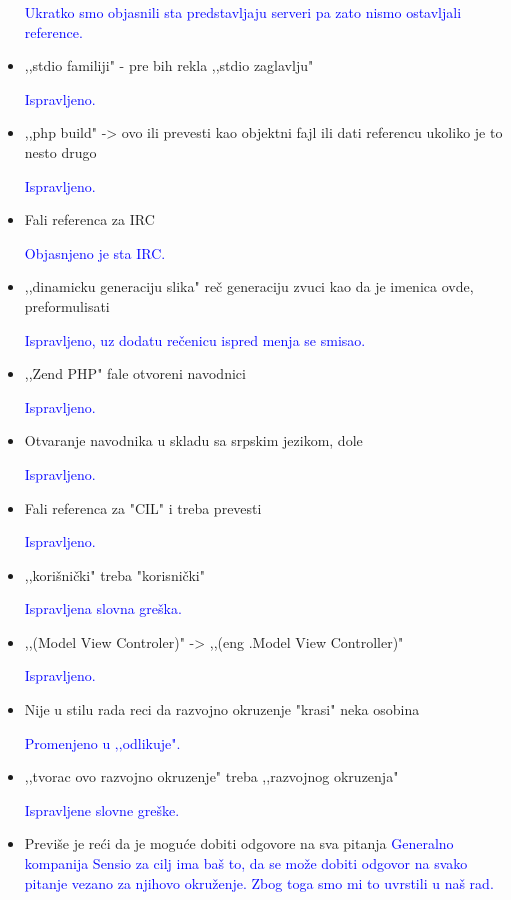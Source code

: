 \documentclass[a4paper]{report}
\newcommand{\odgovor}[1]{\textcolor{blue}{#1}}
\begin{document}
\begin{itemize}
\odgovor{Ukratko smo objasnili sta predstavljaju serveri pa zato nismo ostavljali reference.}

\item ,,stdio familiji" - pre bih rekla ,,stdio zaglavlju"

\odgovor{Ispravljeno.}

\item ,,php build" -> ovo ili prevesti kao objektni fajl ili dati referencu ukoliko je to nesto drugo

\odgovor{Ispravljeno.}

\item Fali referenca za IRC

\odgovor{Objasnjeno je sta IRC.}

\item ,,dinamicku generaciju slika" reč generaciju zvuci kao da je imenica ovde, preformulisati

\odgovor{Ispravljeno, uz dodatu rečenicu ispred menja se smisao.}

\item ,,Zend PHP" fale otvoreni navodnici

\odgovor{Ispravljeno.}

\item Otvaranje navodnika u skladu sa srpskim jezikom, dole

\odgovor{Ispravljeno.}

\item Fali referenca za "CIL" i treba prevesti

\odgovor{Ispravljeno.}

\item ,,korišnički" treba "korisnički"

\odgovor{Ispravljena slovna greška.}

\item ,,(Model View Controler)" -> ,,(eng .Model View Controller)"

\odgovor{Ispravljeno.}

\item Nije u stilu rada reci da razvojno okruzenje "krasi" neka osobina

\odgovor{Promenjeno u ‚‚odlikuje".}

\item ,,tvorac ovo razvojno okruzenje" treba ,,razvojnog okruzenja"

\odgovor{Ispravljene slovne greške.}

\item Previše je reći da je moguće dobiti odgovore na sva pitanja
\odgovor{Generalno kompanija Sensio za cilj ima baš to, da se može dobiti odgovor na svako pitanje vezano za njihovo okruženje.
Zbog toga smo mi to uvrstili u naš rad.}

\end{itemize}
\end{document}
